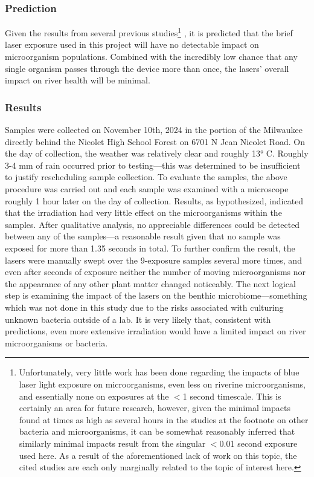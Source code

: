 \documentclass[fleqn,10pt]{SelfArx} %
\begin{document}
	\subsubsection{Prediction}
	Given the results from several previous studies\footnote{Unfortunately, very little work has been done regarding the impacts of blue laser light exposure on microorganisms, even less on riverine microorganisms, and essentially none on exposures at the $<$1 second timescale. This is certainly an area for future research, however, given the minimal impacts found at times as high as several hours in the studies at the footnote on other bacteria and microorganisms, it can be somewhat reasonably inferred that similarly minimal impacts result from the singular $<$0.01 second exposure used here. As a result of the aforementioned lack of work on this topic, the cited studies are each only marginally related to the topic of interest here. } \cite{Dai_Gupta_Murray_Vrahas_Tegos_Hamblin_2012} \cite{lightExposure} \cite{Gorai_Katayama_Obata_Murata_Taguchi_2014} \cite{lightExposure2},  it is predicted that the brief laser exposure used in this project will have no detectable impact on microorganism populations. Combined with the incredibly low chance that any single organism passes through the device more than once, the lasers' overall impact on river health will be minimal.
	\subsubsection{Results}
	Samples were collected on November 10th, 2024 in the portion of the Milwaukee directly behind the Nicolet High School Forest on 6701 N Jean Nicolet Road. On the day of collection, the weather was relatively clear and roughly 13° C. Roughly 3-4 mm of rain occurred prior to testing—this was determined to be insufficient to justify rescheduling sample collection. To evaluate the samples, the above procedure was carried out and each sample was examined with a microscope roughly 1 hour later on the day of collection. 
	Results, as hypothesized, indicated that the irradiation had very little effect on the microorganisms within the samples. After qualitative analysis, no appreciable differences could be detected between any of the samples—a reasonable result given that no sample was exposed for more than 1.35 seconds in total. To further confirm the result, the lasers were manually swept over the 9-exposure samples several more times, and even after seconds of exposure neither the number of moving microorganisms nor the appearance of any other plant matter changed noticeably. 
	The next logical step is examining the impact of the lasers on the \gls{benthic} microbiome—something which was not done in this study due to the risks associated with culturing unknown bacteria outside of a lab. It is very likely that, consistent with predictions, even more extensive irradiation would have a limited impact on river microorganisms or bacteria. 
	
\end{document}
